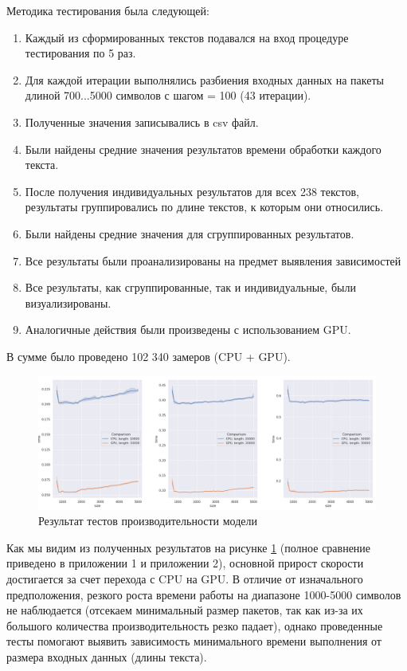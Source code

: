 Методика тестирования была следующей:
\begin{enumerate}
  \item Каждый из сформированных текстов подавался на вход процедуре тестирования по 5 раз.
  \item Для каждой итерации выполнялись разбиения входных данных на пакеты длиной 700...5000 символов с шагом = 100 (43 итерации).
  \item Полученные значения записывались в csv файл.
  \item Были найдены средние значения результатов времени обработки каждого текста. 
  \item После получения индивидуальных результатов для всех 238 текстов, результаты группировались по длине текстов, к которым они относились.
  \item Были найдены средние значения для сгруппированных результатов. 
  \item Все результаты были проанализированы на предмет выявления зависимостей

  \item Все результаты, как сгруппированные, так и индивидуальные, были визуализированы.
  \item Аналогичные действия были произведены с использованием GPU. 
\end{enumerate}

В сумме было проведено 102 340 замеров (CPU + GPU).

\begin{figure}[ht]
\centering
\includegraphics[width=\textwidth]{img/in_text_compare}
\caption{\label{fig:in_text_compare}Результат тестов производительности модели}
\end{figure}

Как мы видим из полученных результатов на рисунке \ref{fig:in_text_compare} (полное сравнение приведено в приложении 1 и приложении 2), основной прирост скорости достигается за счет перехода с CPU на GPU. В отличие от изначального предположения, резкого роста времени работы на диапазоне 1000-5000 символов не наблюдается (отсекаем минимальный размер пакетов, так как из-за их большого количества производительность резко падает), однако проведенные тесты помогают выявить зависимость минимального времени выполнения от размера входных данных (длины текста). 


